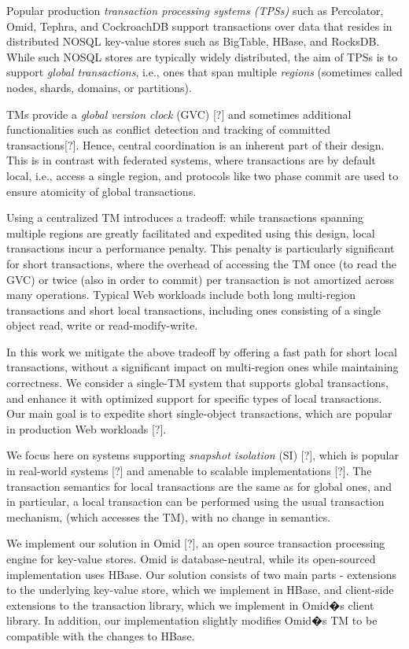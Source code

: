 

Popular production \emph{transaction processing systems (TPSs)} 
such as Percolator, Omid, Tephra, and CockroachDB 
support transactions over data that resides in distributed NOSQL key-value stores such 
as BigTable, HBase, and RocksDB. 
While such NOSQL stores are typically widely distributed, the aim of TPSs is to 
support  \emph{global transactions}, i.e., ones
that span multiple \emph{regions} (sometimes called nodes, shards, domains, or partitions).




TMs provide a \emph{global
version clock} (GVC) [?] and sometimes additional functionalities such as conflict detection and
tracking of committed transactions[?]. 
Hence, central coordination is an inherent part of their design. This is in
contrast with federated systems, where transactions are by default local, i.e.,
access a single region, and protocols like two phase commit are used to ensure
atomicity of global transactions.

Using a centralized TM introduces a tradeoff: while transactions spanning
multiple regions are greatly facilitated and expedited using this design, local
transactions incur a performance penalty. This penalty is particularly
significant for short transactions, where the overhead of accessing the TM once
(to read the GVC) or twice (also in order to commit) per transaction is not
amortized across many operations. Typical Web workloads include both long
multi-region transactions and short local transactions, including ones
consisting of a single object read, write or read-modify-write.

In this work we mitigate the above tradeoff by offering a fast path for short
local transactions, without a significant impact on multi-region ones while
maintaining correctness. We consider a single-TM system that supports global
transactions, and enhance it with optimized support for specific types of local
transactions. Our main goal is to expedite short single-object transactions,
which are popular in production Web workloads [?].

We focus here on systems supporting \emph{snapshot isolation} (SI) [?], which is
popular in real-world systems [?] and amenable to scalable implementations [?].
The transaction semantics for local transactions are the same as for global
ones, and in particular, a local transaction can be performed using the usual
transaction mechanism, (which accesses the TM), with no change in semantics.

We implement our solution in Omid [?], an open source transaction processing
engine for key-value stores. Omid is database-neutral, while its open-sourced
implementation uses HBase. Our solution consists of two main parts - extensions
to the underlying key-value store, which we implement in HBase, and client-side
extensions to the transaction library, which we implement in Omid�s client
library. In addition, our implementation slightly modifies Omid�s TM to be
compatible with the changes to HBase.
 